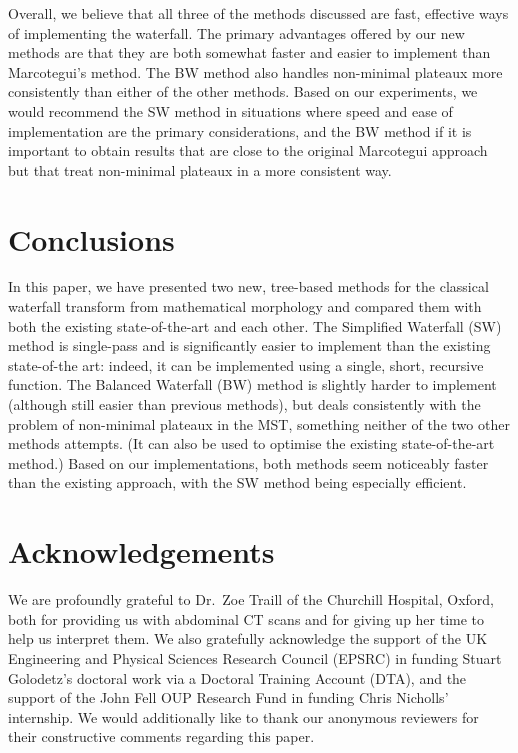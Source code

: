 \documentclass[preprint,a4paper]{elsarticle}
\begin{document}
Overall, we believe that all three of the methods discussed are fast, effective ways of implementing the waterfall. The primary advantages offered by our new methods are that they are both somewhat faster and easier to implement than Marcotegui's method. The BW method also handles non-minimal plateaux more consistently than either of the other methods. Based on our experiments, we would recommend the SW method in situations where speed and ease of implementation are the primary considerations, and the BW method if it is important to obtain results that are close to the original Marcotegui approach but that treat non-minimal plateaux in a more consistent way.

\section{Conclusions}
\label{sec:conclusions}

In this paper, we have presented two new, tree-based methods for the classical waterfall transform from mathematical morphology and compared them with both the existing state-of-the-art and each other. The Simplified Waterfall (SW) method is single-pass and is significantly easier to implement than the existing state-of-the art: indeed, it can be implemented using a single, short, recursive function. The Balanced Waterfall (BW) method is slightly harder to implement (although still easier than previous methods), but deals consistently with the problem of non-minimal plateaux in the MST, something neither of the two other methods attempts. (It can also be used to optimise the existing state-of-the-art method.) Based on our implementations, both methods seem noticeably faster than the existing approach, with the SW method being especially efficient.

\section{Acknowledgements}
\label{sec:acknowledgements}

We are profoundly grateful to Dr.\ Zoe Traill of the Churchill Hospital, Oxford, both for providing us with abdominal CT scans and for giving up her time to help us interpret them. We also gratefully acknowledge the support of the UK Engineering and Physical Sciences Research Council (EPSRC) in funding Stuart Golodetz's doctoral work via a Doctoral Training Account (DTA), and the support of the John Fell OUP Research Fund in funding Chris Nicholls' internship. We would additionally like to thank our anonymous reviewers for their constructive comments regarding this paper.



\end{document}
